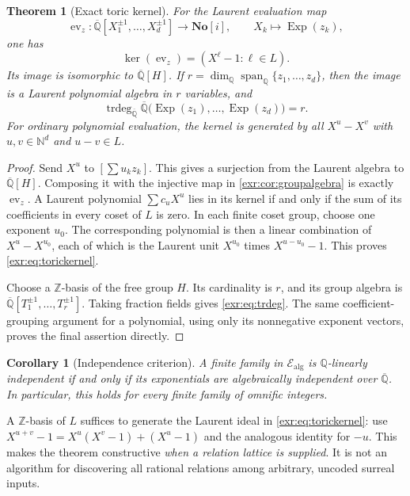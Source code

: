 \documentclass[11pt,letterpaper]{article}
\numberwithin{equation}{section}
\newtheorem{theorem}{Theorem}[section]
\newtheorem{corollary}[corollary]{Corollary}
\theoremstyle{definition}
\theoremstyle{remark}
\newcommand{\SC}{\mathbf{No}[i]}
\newcommand{\Z}{\mathbb Z}
\newcommand{\Q}{\mathbb Q}
\newcommand{\N}{\mathbb N}
\newcommand{\Qb}{\overline{\mathbb Q}}
\newcommand{\Ealg}{\mathcal E_{\mathrm{alg}}}
\newcommand{\Exp}{\operatorname{Exp}}
\newcommand{\trdeg}{\operatorname{trdeg}}
\newcommand{\spanQ}{\operatorname{span}_{\Q}}
\begin{document}
\begin{theorem}[Exact toric kernel]\label{exr:thm:toric}
For the Laurent evaluation map
\begin{equation}
 \operatorname{ev}_z:\Qb[X_1^{\pm1},\ldots,X_d^{\pm1}]\to\SC,
 \qquad X_k\longmapsto\Exp(z_k),
\end{equation}
one has
\begin{equation}\label{exr:eq:torickernel}
 \ker(\operatorname{ev}_z)=(X^\ell-1:\ell\in L).
\end{equation}
Its image is isomorphic to $\Qb[H]$. If
$r=\dim_\Q\spanQ\{z_1,\ldots,z_d\}$, then the image is a Laurent polynomial algebra
in $r$ variables, and
\begin{equation}\label{exr:eq:trdeg}
 \trdeg_{\Qb}\Qb\bigl(\Exp(z_1),\ldots,\Exp(z_d)\bigr)=r.
\end{equation}
For ordinary polynomial evaluation, the kernel is generated by all
$X^u-X^v$ with $u,v\in\N^d$ and $u-v\in L$.
\end{theorem}
\begin{proof}
Send $X^u$ to $[\sum u_kz_k]$. This gives a surjection from the Laurent algebra to
$\Qb[H]$. Composing it with the injective map in \cref{exr:cor:groupalgebra} is exactly
$\operatorname{ev}_z$. A Laurent polynomial $\sum c_uX^u$ lies in its kernel if and
only if the sum of its coefficients in every coset of $L$ is zero. In each finite
coset group, choose one exponent $u_0$. The corresponding polynomial is then a
linear combination of $X^u-X^{u_0}$, each of which is the Laurent unit $X^{u_0}$
times $X^{u-u_0}-1$. This proves \eqref{exr:eq:torickernel}.

Choose a $\Z$-basis of the free group $H$. Its cardinality is $r$, and its group
algebra is $\Qb[T_1^{\pm1},\ldots,T_r^{\pm1}]$. Taking fraction fields gives
\eqref{exr:eq:trdeg}. The same coefficient-grouping argument for a polynomial, using
only its nonnegative exponent vectors, proves the final assertion directly.
\end{proof}

\begin{corollary}[Independence criterion]\label{exr:cor:algind}
A finite family in $\Ealg$ is $\Q$-linearly independent if and only if its
exponentials are algebraically independent over $\Qb$. In particular, this holds
for every finite family of omnific integers.
\end{corollary}

A $\Z$-basis of $L$ suffices to generate the Laurent ideal in
\eqref{exr:eq:torickernel}: use $X^{u+v}-1=X^u(X^v-1)+(X^u-1)$ and the analogous
identity for $-u$. This makes the theorem constructive \emph{when a relation
lattice is supplied}. It is not an algorithm for discovering all rational
relations among arbitrary, uncoded surreal inputs.
\end{document}
